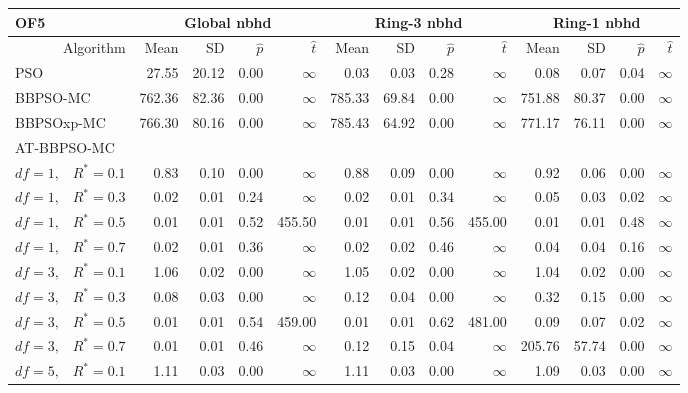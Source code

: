 \documentclass[12pt]{article}
\begin{document}
\begin{table}[ht]
\centering
\tiny{
\begin{tabular}{r|rrrr|rrrr|rrrr}
\multicolumn{1}{l}{OF5} & \multicolumn{4}{c}{Global nbhd} & \multicolumn{4}{c}{Ring-3 nbhd} & \multicolumn{4}{c}{Ring-1 nbhd}\\
  \hline
Algorithm & Mean & SD & $\widehat{p}$ & $\widehat{t}$ & Mean & SD & $\widehat{p}$ & $\widehat{t}$ & Mean & SD & $\widehat{p}$ & $\widehat{t}$ \\ 
  \hline
\multicolumn{1}{l|}{PSO} & 27.55 & 20.12 & 0.00 & $\infty$ & 0.03 & 0.03 & 0.28 & $\infty$ & 0.08 & 0.07 & 0.04 & $\infty$ \\ 
  \multicolumn{1}{l|}{BBPSO-MC} & 762.36 & 82.36 & 0.00 & $\infty$ & 785.33 & 69.84 & 0.00 & $\infty$ & 751.88 & 80.37 & 0.00 & $\infty$ \\ 
  \multicolumn{1}{l|}{BBPSOxp-MC} & 766.30 & 80.16 & 0.00 & $\infty$ & 785.43 & 64.92 & 0.00 & $\infty$ & 771.17 & 76.11 & 0.00 & $\infty$ \\ 
\hline
\multicolumn{1}{l|}{AT-BBPSO-MC} &&&&&&&&&&&&\\
  $df = 1,\enspace$ $R^* =0.1$ & 0.83 & 0.10 & 0.00 & $\infty$ & 0.88 & 0.09 & 0.00 & $\infty$ & 0.92 & 0.06 & 0.00 & $\infty$ \\ 
  $df = 1,\enspace$ $R^* =0.3$ & 0.02 & 0.01 & 0.24 & $\infty$ & 0.02 & 0.01 & 0.34 & $\infty$ & 0.05 & 0.03 & 0.02 & $\infty$ \\ 
  $df = 1,\enspace$ $R^* =0.5$ & 0.01 & 0.01 & 0.52 & 455.50 & 0.01 & 0.01 & 0.56 & 455.00 & 0.01 & 0.01 & 0.48 & $\infty$ \\ 
  $df = 1,\enspace$ $R^* =0.7$ & 0.02 & 0.01 & 0.36 & $\infty$ & 0.02 & 0.02 & 0.46 & $\infty$ & 0.04 & 0.04 & 0.16 & $\infty$ \\ 
  $df = 3,\enspace$ $R^* =0.1$ & 1.06 & 0.02 & 0.00 & $\infty$ & 1.05 & 0.02 & 0.00 & $\infty$ & 1.04 & 0.02 & 0.00 & $\infty$ \\ 
  $df = 3,\enspace$ $R^* =0.3$ & 0.08 & 0.03 & 0.00 & $\infty$ & 0.12 & 0.04 & 0.00 & $\infty$ & 0.32 & 0.15 & 0.00 & $\infty$ \\ 
  $df = 3,\enspace$ $R^* =0.5$ & 0.01 & 0.01 & 0.54 & 459.00 & 0.01 & 0.01 & 0.62 & 481.00 & 0.09 & 0.07 & 0.02 & $\infty$ \\ 
  $df = 3,\enspace$ $R^* =0.7$ & 0.01 & 0.01 & 0.46 & $\infty$ & 0.12 & 0.15 & 0.04 & $\infty$ & 205.76 & 57.74 & 0.00 & $\infty$ \\ 
  $df = 5,\enspace$ $R^* =0.1$ & 1.11 & 0.03 & 0.00 & $\infty$ & 1.11 & 0.03 & 0.00 & $\infty$ & 1.09 & 0.03 & 0.00 & $\infty$ \\ 

\end{tabular}}
\end{table}
\end{document}
